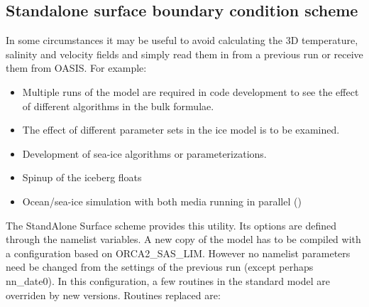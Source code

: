 \documentclass[../main/NEMO_manual]{subfiles}
\begin{document}
\subsection{Standalone surface boundary condition scheme}
\label{subsec:SAS_iof}



In some circumstances it may be useful to avoid calculating the 3D temperature,
salinity and velocity fields and simply read them in from a previous run or receive them from OASIS.  
For example:

\begin{itemize}
\item
  Multiple runs of the model are required in code development to
  see the effect of different algorithms in the bulk formulae.
\item
  The effect of different parameter sets in the ice model is to be examined.
\item
  Development of sea-ice algorithms or parameterizations.
\item
  Spinup of the iceberg floats
\item
  Ocean/sea-ice simulation with both media running in parallel ()
\end{itemize}

The StandAlone Surface scheme provides this utility.
Its options are defined through the  namelist variables.
A new copy of the model has to be compiled with a configuration based on ORCA2\_SAS\_LIM.
However no namelist parameters need be changed from the settings of the previous run (except perhaps nn{\_}date0).
In this configuration, a few routines in the standard model are overriden by new versions.
Routines replaced are:
\end{document}
